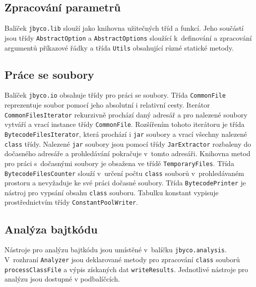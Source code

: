 \subsection{Zpracování parametrů}

Balíček \texttt{jbyco.lib} slouží jako knihovna užitečných tříd a funkcí. Jeho součástí jsou třídy \texttt{AbstractOption} a \texttt{AbstractOptions} sloužící k~definování a zpracování argumentů příkazové řádky a třída \texttt{Utils} obsahující různé statické metody. 

\subsection{Práce se soubory}

Balíček \texttt{jbyco.io} obsahuje třídy pro práci se soubory. Třída \texttt{CommonFile} reprezentuje soubor pomocí jeho absolutní i relativní cesty. Iterátor \texttt{CommonFilesIterator} rekurzivně prochází daný adresář a pro nalezené soubory vytváří a vrací instance třídy \texttt{CommonFile}. Rozšířením tohoto iterátoru je třída \texttt{BytecodeFilesIterator}, která prochází i \texttt{jar} soubory a vrací všechny nalezené \texttt{class} třídy. Nalezené \texttt{jar} soubory jsou pomocí třídy \texttt{JarExtractor} rozbaleny do dočasného adresáře a prohledávání pokračuje v~tomto adresáři. Knihovna metod pro práci s~dočasnými soubory je obsažena ve třídě \texttt{TemporaryFiles}. Třída \texttt{BytecodeFilesCounter} slouží v~určení počtu \texttt{class} souborů v~prohledávaném prostoru a nevyžaduje ke své práci dočasné soubory. 
Třída \texttt{BytecodePrinter} je nástroj pro vypsání obsahu \texttt{class} souboru. Tabulku konstant vypisuje prostřednictvím třídy \texttt{ConstantPoolWriter}.  

\subsection{Analýza bajtkódu}

Nástroje pro analýzu bajtkódu jsou umístěné v~balíčku \texttt{jbyco.analysis}. V~rozhraní \texttt{Analyzer} jsou deklarované metody pro zpracování \texttt{class} souborů \texttt{processClassFile} a výpis získaných dat \texttt{writeResults}. Jednotlivé nástroje pro analýzu jsou dostupné v podbalíčcích.

